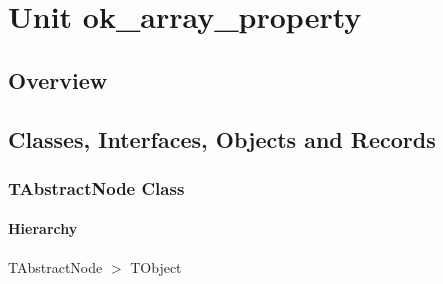 \documentclass{report}
\newif\ifpdf
\begin{document}
\label{toc}\tableofcontents
\newpage
\newlength{\tmplength}
\chapter{Unit ok{\_}array{\_}property}
\label{ok_array_property}
\section{Overview}
\begin{description}
\item[\texttt{\begin{ttfamily}TAbstractNode\end{ttfamily} Class}]
\end{description}
\section{Classes, Interfaces, Objects and Records}
\ifpdf
\subsection*{\large{\textbf{TAbstractNode Class}}\normalsize\hspace{1ex}\hrulefill}
\else
\subsection*{TAbstractNode Class}
\fi
\label{ok_array_property.TAbstractNode}
\subsubsection*{\large{\textbf{Hierarchy}}\normalsize\hspace{1ex}\hfill}
TAbstractNode {$>$} TObject
\end{document}
